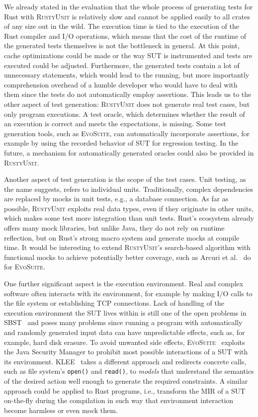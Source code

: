 \documentclass[paper=a4,%
  twoside,%
  BCOR4mm,%
  abstract=true,%
  toc=bibliography,%
  chapterprefix=true,%
  toc=bibliographynumbered,%
  open=right,%
  english,%
  pagesize=pdftex]{scrreprt}
\newcommand{\tech}{\textsc{RustyUnit}\xspace}
\newcommand{\mir}{\ac{MIR}\xspace}
\newcommand{\sut}{\ac{SUT}\xspace}
\begin{document}
We already stated in the evaluation that the whole process of generating tests for Rust with \tech is relatively slow and cannot be applied easily to all crates of any size out in the wild. The execution time is tied to the execution of the Rust compiler and I/O operations, which means that the cost of the runtime of the generated tests themselves is not the bottleneck in general. At this point, cache optimizations could be made or the way \sut is instrumented and tests are executed could be adjusted. Furthermore, the generated tests contain a lot of unnecessary statements, which would lead to the running, but more importantly comprehension overhead of a humble developer who would have to deal with them since the tests do not automatically employ assertions. This leads us to the other aspect of test generation: \tech does not generate real test cases, but only program executions. A test oracle, which determines whether the result of an execution is correct and meets the expectations, is missing. Some test generation tools, such as \textsc{EvoSuite}, can automatically incorporate assertions, for example by using the recorded behavior of \sut for regression testing. In the future, a mechanism for automatically generated oracles could also be provided in \tech.

Another aspect of test generation is the scope of the test cases. Unit testing, as the name suggests, refers to individual units. Traditionally, complex dependencies are replaced by mocks in unit tests, e.g., a database connection. As far as possible, \tech exploits real data types, even if they originate in other units, which makes some test more integration than unit tests. Rust's ecosystem already offers many mock libraries, but unlike Java, they do not rely on runtime reflection, but on Rust's strong macro system and generate mocks at compile time. It would be interesting to extend \tech's search-based algorithm with functional mocks to achieve potentially better coverage, such as Arcuri et al.~\cite{Arcuri2017} do for \textsc{EvoSuite}.

One further significant aspect is the execution environment. Real and complex software often interacts with its environment, for example by making I/O calls to the file system or establishing \ac{TCP} connections. Lack of handling of the execution environment the \sut lives within is still one of the open problems in \ac{SBST}~\cite{McMinn2011} and poses many problems since running a program with automatically and randomly generated input data can have unpredictable effects, such as, for example, hard disk erasure. To avoid unwanted side effects, \textsc{EvoSuite}~\cite{Fraser2013a} exploits the Java Security Manager to prohibit most possible interactions of a \sut with its environment. \textsc{KLEE}~\cite{cadar2008klee} takes a different approach and redirects concrete calls, such as file system's \texttt{open()} and \texttt{read()}, to \emph{models} that understand the semantics of the desired action well enough to generate the required constraints. A similar approach could be applied to Rust programs, i.e., transform the \mir of a \sut on-the-fly during the compilation in such way that environment interaction become harmless or even mock them.
\end{document}
